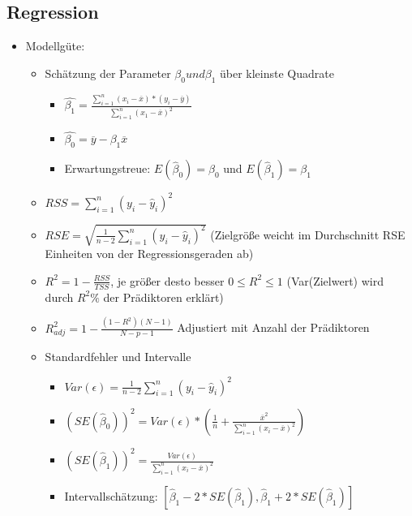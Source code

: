 \documentclass[a4paper]{article}
\begin{document}
\begin{landscape}
\begin{multicols}{3}
        \section{Regression}
        \begin{itemize}[noitemsep,nolistsep,leftmargin=*]
            \item Modellgüte:
            \begin{itemize}[noitemsep,nolistsep,leftmargin=*]
                \item Schätzung der Parameter $\beta_0 und \beta_1$ über kleinste Quadrate
                \begin{itemize}[noitemsep,nolistsep,leftmargin=*]
                    \item $\hat{\beta_1} = \frac{\sum_{i=1}^{n}(x_i-\overline{x})*(y_i-\overline{y})}{\sum_{i=1}^{n}(x_1-\overline{x})^2}$ 
                    \item $\hat{\beta_0} = \overline{y} - \beta_1\overline{x}$
                    \item Erwartungstreue: $E(\hat{\beta}_0) = \beta_0$ und $E(\hat{\beta}_1) = \beta_1$
                \end{itemize}
                \item $RSS = \sum_{i=1}^{n}(y_i-\hat{y}_i)^2$
                \item $RSE = \sqrt{\frac{1}{n-2}\sum_{i=1}^{n}(y_i-\hat{y}_i)^2}$ (Zielgröße weicht im Durchschnitt RSE Einheiten von der Regressionsgeraden ab)
                \item $R^2 = 1 - \frac{RSS}{TSS}$, je größer desto besser $0 \leq R^2 \leq 1$ (Var(Zielwert) wird durch $R^2\%$ der Prädiktoren erklärt)
                \item $R^2_{adj} = 1- \frac{(1-R^2)(N-1)}{N-p-1}$ Adjustiert mit Anzahl der Prädiktoren
                \item Standardfehler und Intervalle
                \begin{itemize}[noitemsep,nolistsep,leftmargin=*]
                    \item $Var(\epsilon)=\frac{1}{n-2}\sum_{i=1}^{n}(y_i-\hat{y}_i)^2$
                    \item $(SE(\hat{\beta}_0))^2 = Var(\epsilon)*(\frac{1}{n}+\frac{\overline{x}^2}{\sum_{i=1}^{n}(x_i-\overline{x})^2})$
                    \item $(SE(\hat{\beta}_1))^2 = \frac{Var(\epsilon)}{\sum_{i=1}^{n}(x_i-\overline{x})^2}$
                    \item Intervallschätzung: $[\hat{\beta}_1-2*SE(\hat{\beta}_1), \hat{\beta}_1+2*SE(\hat{\beta}_1)]$

\end{itemize}
\end{itemize}
\end{itemize}
\end{multicols}
\end{landscape}
\end{document}
